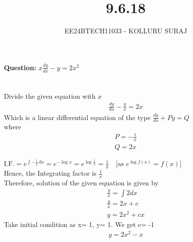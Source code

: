 \documentclass[journal]{IEEEtran}
\numberwithin{equation}{enumi}
\numberwithin{figure}{enumi}
\begin{document}

\title{9.6.18}
\author{EE24BTECH11033 - KOLLURU SURAJ}
{\let\newpage\relax\maketitle}
\textbf{Question:} 
$x\frac{dy}{dx}-y=2x^2$
\\\\
\solution\\
Divide the given equation with $x$
\begin{align}
    \frac{dy}{dx}-\frac{y}{x}=2x\label{1} 
\end{align}
Which is a linear differential equation of the type $\frac{dy}{dx} +Py=Q$\\ where
\begin{align}
P= -\frac{1}{x}\\
Q=2x
\end{align}

$\text{I.F.} = e^{\int -\frac{1}{x} \, dx} = e^{-\log x} = e^{\log \frac{1}{x}} = \frac{1}{x} \quad \text{[as } e^{\log f(x)} = f(x) \text{]}$\\

Hence, the Integrating factor is $\frac{1}{x}$\\
Therefore, solution of the given equation is given by\\
\begin{align}
    \frac{y}{x}=\int 2dx\\
    \frac{y}{x}=2x+c\\
    y=2x^2+cx
\end{align}
Take initial condition as x= 1, y= 1. We get c= -1
\begin{align}
    y=2x^2- x
\end{align}
\end{document}
